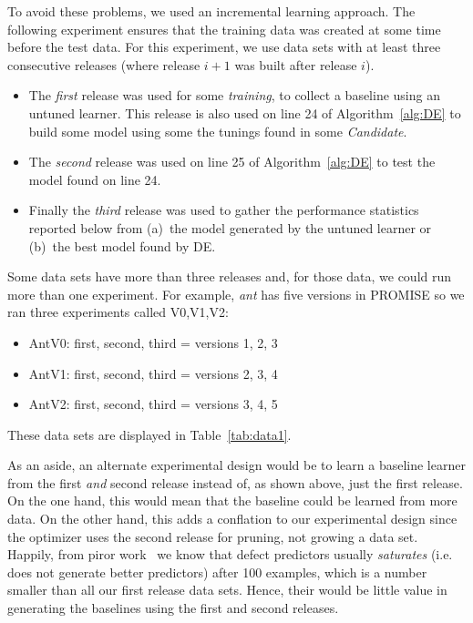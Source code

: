 \documentclass{sig-alternative}
\newcommand{\bi}{\begin{itemize}[leftmargin=0.4cm]}
\newcommand{\ei}{\end{itemize}}
\newcommand{\tion}[1]{\S\ref{sect:#1}}
\newcommand{\tab}[1]{Table~\ref{tab:#1}}
\begin{document}
To avoid these problems, we used an incremental learning approach. The following
experiment ensures that the training data was created at some time before the test
data.
For this experiment, we use data sets with at least three  
consecutive releases  (where release $i+1$ was built after release $i$).
\bi 
\item The {\em first} release was used for some  {\em training}, to collect a baseline
   using an untuned learner. This release is also used  on line 24 of Algorithm~\ref{alg:DE} to
   build some model using some the tunings found in some {\em Candidate}.
   \item The {\em second} release was used on line 25 of Algorithm~\ref{alg:DE} to 
   test the model found on line 24.
   \item Finally the {\em third} release was used to gather the performance statistics
   reported below from (a)~the model generated by the untuned learner or (b)~the
   best model found by DE.
   \ei

Some data sets have more than three releases and, for those data, we could run more
 than one experiment. For example, {\em ant} has five versions in PROMISE so
 we ran three experiments called V0,V1,V2:
 \bi
 \item AntV0: first, second, third = versions 1, 2, 3
 \item AntV1: first, second, third = versions 2, 3, 4
 \item AntV2: first, second, third = versions 3, 4, 5
 \ei 
These data sets are displayed in \tab{data1}.

As an aside, an alternate experimental design would be to 
learn a baseline learner from the first {\em and} second release
instead of, as shown above,  just the first release. On the one hand,
this would mean that the baseline could be learned from more data.
On the other hand, this adds a conflation to our experimental design
since the optimizer uses the second release for pruning, not growing a data set.  Happily, from 
piror work~\cite{Menzies:2008aa} we know that defect predictors usually {\em saturates} (i.e.
does not generate better predictors) after 100 examples, which is a number smaller than all our first release data sets. Hence, their would
be little value in generating the baselines using the first and second
releases. 
\end{document}
